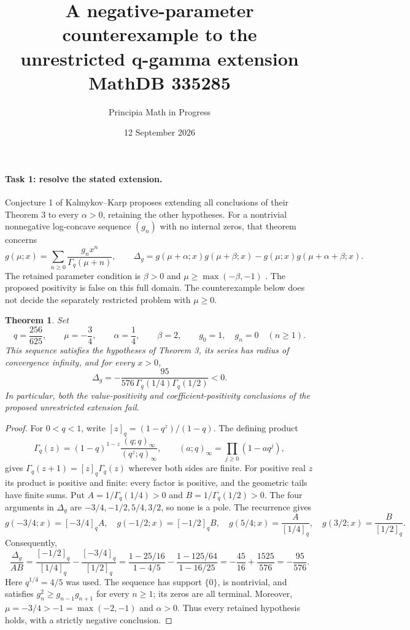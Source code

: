 \documentclass[11pt]{article}
\title{A negative-parameter counterexample to the\\
unrestricted q-gamma extension\\
\large MathDB 335285}
\author{Principia Math in Progress}
\date{12 September 2026}
\newtheorem{theorem}{Theorem}
\newcommand{\Gq}{\Gamma_q}
\begin{document}
\maketitle

\paragraph{Task 1: resolve the stated extension.}
Conjecture 1 of Kalmykov--Karp \cite[p.~344]{KK} proposes extending
all conclusions of their Theorem 3 to every $\alpha>0$, retaining
the other hypotheses. For a nontrivial nonnegative log-concave sequence
$(g_n)$ with no internal zeros, that theorem concerns
\[
 g(\mu;x)=\sum_{n\ge0}\frac{g_nx^n}{\Gq(\mu+n)},\qquad
 \Delta_g=g(\mu+\alpha;x)g(\mu+\beta;x)
             -g(\mu;x)g(\mu+\alpha+\beta;x).
\]
The retained parameter condition is
$\beta>0$ and $\mu\ge\max(-\beta,-1)$
\cite[p.~342]{KK}.
The proposed positivity is false on this full domain.
The counterexample below does not decide the separately restricted
problem with $\mu\ge0$.

\begin{theorem}
Set
\[
 q=\frac{256}{625},\qquad
 \mu=-\frac34,\qquad \alpha=\frac14,\qquad \beta=2,
 \qquad g_0=1,\quad g_n=0\quad(n\ge1).
\]
This sequence satisfies the hypotheses of Theorem 3, its series has
radius of convergence infinity, and for every $x>0$,
\[
 \boxed{\displaystyle
 \Delta_g=-\frac{95}{576\,\Gq(1/4)\Gq(1/2)}<0.}
\]
In particular, both the value-positivity and coefficient-positivity
conclusions of the proposed unrestricted extension fail.
\end{theorem}

\begin{proof}
For $0<q<1$, write $[z]_q=(1-q^z)/(1-q)$.
The defining product
\[
 \Gq(z)=(1-q)^{1-z}\frac{(q;q)_\infty}{(q^z;q)_\infty},
 \qquad (a;q)_\infty=\prod_{j\ge0}(1-aq^j),
\]
gives $\Gq(z+1)=[z]_q\Gq(z)$ wherever both sides are finite.
For positive real $z$ its product is positive and finite: every factor
is positive, and the geometric tails have finite sums.
Put $A=1/\Gq(1/4)>0$ and $B=1/\Gq(1/2)>0$.
The four arguments in $\Delta_g$ are
$-3/4,-1/2,5/4,3/2$, so none is a pole.
The recurrence gives
\[
 g(-3/4;x)=[-3/4]_q A,\quad
 g(-1/2;x)=[-1/2]_q B,\quad
 g(5/4;x)=\frac{A}{[1/4]_q},\quad
 g(3/2;x)=\frac{B}{[1/2]_q}.
\]
Consequently,
\[
 \frac{\Delta_g}{AB}
 =\frac{[-1/2]_q}{[1/4]_q}
  -\frac{[-3/4]_q}{[1/2]_q}
 =\frac{1-25/16}{1-4/5}
  -\frac{1-125/64}{1-16/25}
 =-\frac{45}{16}+\frac{1525}{576}
 =-\frac{95}{576}.
\]
Here $q^{1/4}=4/5$ was used. The sequence has support $\{0\}$,
is nontrivial, and satisfies $g_n^2\ge g_{n-1}g_{n+1}$ for every
$n\ge1$; its zeros are all terminal. Moreover,
$\mu=-3/4>-1=\max(-2,-1)$ and $\alpha>0$.
Thus every retained hypothesis holds, with a strictly negative conclusion.
\end{proof}
\end{document}
